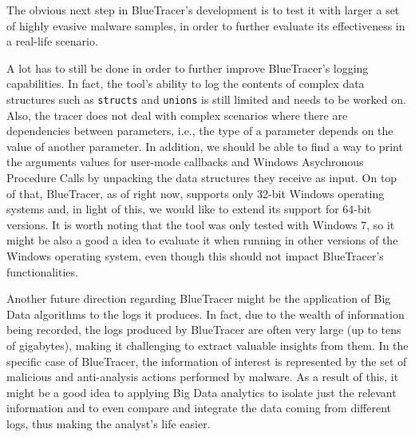 The obvious next step in BlueTracer's development is to test it with larger a set of highly evasive malware samples, in order to further evaluate its effectiveness in a real-life scenario.

A lot has to still be done in order to further improve BlueTracer's logging capabilities. In fact, the tool's ability to log the contents of complex data structures such as \texttt{structs} and \texttt{unions} is still limited and needs to be worked on. Also, the tracer does not deal with complex scenarios where there are dependencies between parameters, i.e., the type of a parameter depends on the value of another parameter. In addition, we should be able to find a way to print the arguments values for user-mode callbacks and Windows Asychronous Procedure Calls by unpacking the data structures they receive as input. On top of that, BlueTracer, as of right now, supports only 32-bit Windows operating systems and, in light of this, we would like to extend its support for 64-bit versions. It is worth noting that the tool was only tested with Windows 7, so it might be also a good a idea to evaluate it when running in other versions of the Windows operating system, even though this should not impact BlueTracer's functionalities.

Another future direction regarding BlueTracer might be the application of Big Data algorithms to the logs it produces. In fact, due to the wealth of information being recorded, the logs produced by BlueTracer are often very large (up to tens of gigabytes), making it challenging to extract valuable insights from them. In the specific case of BlueTracer, the information of interest is represented by the set of malicious and anti-analysis actions performed by malware. As a result of this, it might be a good idea to applying Big Data analytics to isolate just the relevant information and to even compare and integrate the data coming from different logs, thus making the analyst's life easier.

\iffalse
Two areas:
\begin{enumerate}
\item Tools capabilities: support for struct, compatibility extension, more malwares tested
\item Data Analysis Techniques: data analysis for threat intelligence to analyze the logs.
\end{enumerate}
\fi
